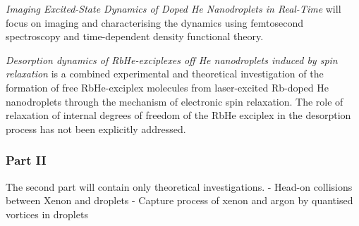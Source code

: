 \documentclass[11pt,a4paper,twoside]{article}
\begin{document}
			\emph{Imaging Excited-State Dynamics of Doped He Nanodroplets in Real-Time} will focus on imaging and characterising the dynamics using femtosecond spectroscopy and  time-dependent density functional theory.
			
			\emph{Desorption dynamics of RbHe-exciplexes off He nanodroplets induced by spin relaxation} is a combined experimental and theoretical investigation of the formation of free RbHe-exciplex molecules from laser-excited Rb-doped He nanodroplets through the mechanism of electronic spin relaxation. The role of relaxation of internal degrees of freedom of the RbHe exciplex in the desorption process has not been explicitly addressed.

		\subsubsection{Part II}
			The second part will contain only theoretical investigations.
			- Head-on collisions between Xenon and droplets
			- Capture process of xenon and argon by quantised vortices in droplets
			









































\end{document}
